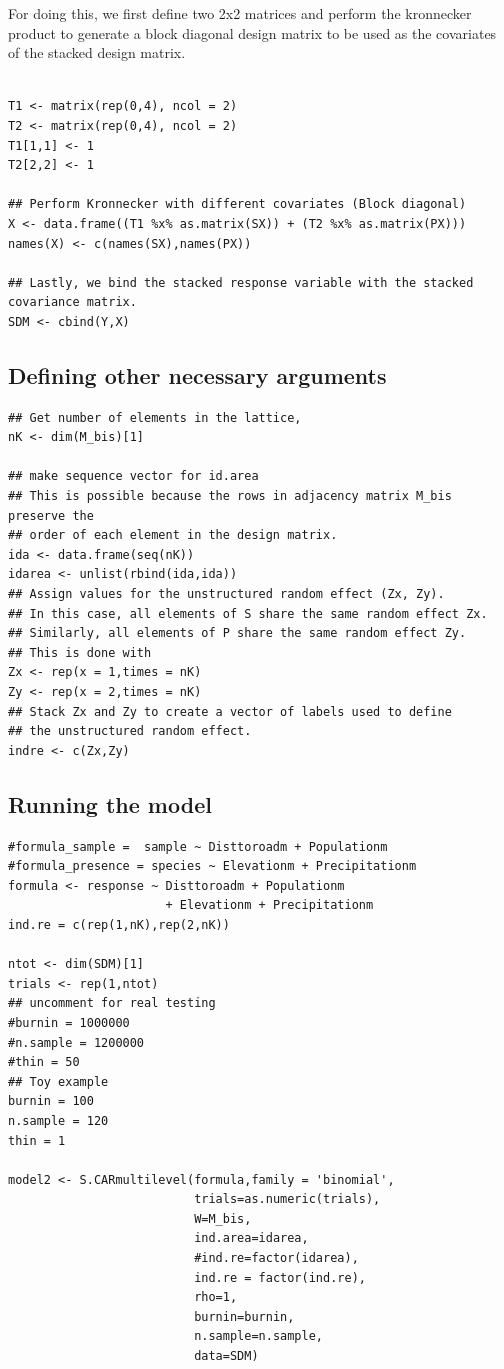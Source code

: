 \documentclass[11pt]{article}
\begin{document}
For doing this, we first define two 2x2 matrices and perform the kronnecker product to generate a block diagonal design matrix to be used as the covariates of the stacked design matrix.

\begin{verbatim}

T1 <- matrix(rep(0,4), ncol = 2)
T2 <- matrix(rep(0,4), ncol = 2)
T1[1,1] <- 1
T2[2,2] <- 1

## Perform Kronnecker with different covariates (Block diagonal)
X <- data.frame((T1 %x% as.matrix(SX)) + (T2 %x% as.matrix(PX)))
names(X) <- c(names(SX),names(PX))

## Lastly, we bind the stacked response variable with the stacked covariance matrix.
SDM <- cbind(Y,X)
\end{verbatim}

\subsection{Defining other necessary arguments}
\label{sec:org58b509c}
\begin{verbatim}
## Get number of elements in the lattice,
nK <- dim(M_bis)[1]

## make sequence vector for id.area
## This is possible because the rows in adjacency matrix M_bis preserve the
## order of each element in the design matrix.
ida <- data.frame(seq(nK))
idarea <- unlist(rbind(ida,ida))
## Assign values for the unstructured random effect (Zx, Zy).
## In this case, all elements of S share the same random effect Zx.
## Similarly, all elements of P share the same random effect Zy.
## This is done with
Zx <- rep(x = 1,times = nK)
Zy <- rep(x = 2,times = nK)
## Stack Zx and Zy to create a vector of labels used to define
## the unstructured random effect.
indre <- c(Zx,Zy)
\end{verbatim}

\subsection{Running the model}
\label{sec:orgf718d66}
\begin{verbatim}
#formula_sample =  sample ~ Disttoroadm + Populationm
#formula_presence = species ~ Elevationm + Precipitationm
formula <- response ~ Disttoroadm + Populationm
                      + Elevationm + Precipitationm
ind.re = c(rep(1,nK),rep(2,nK))

ntot <- dim(SDM)[1]
trials <- rep(1,ntot)
## uncomment for real testing
#burnin = 1000000
#n.sample = 1200000
#thin = 50
## Toy example
burnin = 100
n.sample = 120
thin = 1

model2 <- S.CARmultilevel(formula,family = 'binomial',
                          trials=as.numeric(trials),
                          W=M_bis,
                          ind.area=idarea,
                          #ind.re=factor(idarea),
                          ind.re = factor(ind.re),
                          rho=1,
                          burnin=burnin,
                          n.sample=n.sample,
                          data=SDM)
\end{verbatim}
\end{document}
